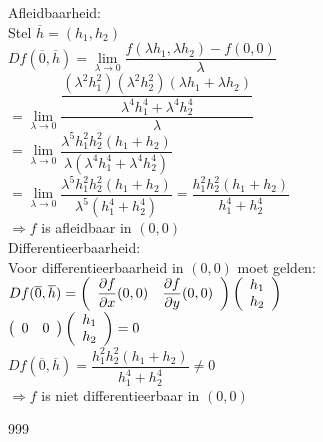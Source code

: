 \documentclass[a4paper]{article}
\newcommand{\dlim}{\lim\limits}
\begin{document}
Afleidbaarheid:\\

Stel $\overline{h} = (h_1,h_2)$\\

$Df(\overline{0}, \overline{h}) = \dlim_{\lambda \rightarrow 0} \dfrac{f(\lambda h_1, \lambda h_2) - f(0,0)}{\lambda}$\\

$= \dlim_{\lambda \rightarrow 0} \dfrac{\dfrac{(\lambda^2 h_1^2)(\lambda^2 h_2^2)(\lambda h_1 + \lambda h_2)}{\lambda^4 h_1^4 + \lambda^4 h_2^4}}{\lambda}$\\

$= \dlim_{\lambda \rightarrow 0} \dfrac{\lambda^5 h_1^2 h_2^2 (h_1 + h_2)}{\lambda (\lambda^4 h_1^4 + \lambda^4 h_2^4)}$\\

$= \dlim_{\lambda \rightarrow 0} \dfrac{\lambda^5 h_1^2 h_2^2 (h_1 + h_2)}{\lambda^5 (h_1^4 + h_2^4)} = \dfrac{h_1^2 h_2^2 (h_1 + h_2)}{h_1^4 + h_2^4}$\\

$\Rightarrow f$ is afleidbaar in $(0,0)$\\

Differentieerbaarheid:\\

Voor differentieerbaarheid in $(0,0)$ moet gelden: $Df(\overline{0}, \overline{h}) = \left(\begin{array}{c c} \dfrac{\partial f}{\partial x}(0,0) & \dfrac{\partial f}{\partial y}(0,0) \end{array}\right) \left(\begin{array}{c} h_1 \\ h_2 \end{array}\right)$\\

$\left(\begin{array}{c c} 0 & 0 \end{array}\right) \left(\begin{array}{c} h_1 \\ h_2 \end{array}\right) = 0$\\

$Df(\overline{0}, \overline{h}) = \dfrac{h_1^2 h_2^2 (h_1 + h_2)}{h_1^4 + h_2^4} \neq 0$\\

$\Rightarrow f$ is niet differentieerbaar in $(0,0)$\\

\begin{thebibliography}{999}
\end{thebibliography}
\end{document}
